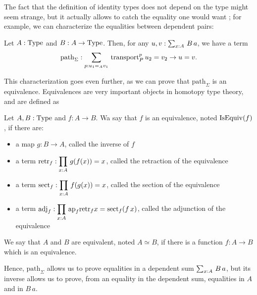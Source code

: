 The fact that the 
definition of identity types does not depend on the type might seem strange, but it
actually allows to catch the equality one would want ; for example, we
can characterize the equalities between dependent pairs:

\begin{lem}
  Let $A:\operatorname{Type}$ and $B:A\to\operatorname{Type}$. Then, for any $u,v:\sum_{x:A}\, B\,
    a$, we have a term
\[ \mathrm{path}_\Sigma : \sum_{p:u_1 =_A v_1}\, \operatorname{transport}_P^p u_2 = v_2 \to u = v.\]
\end{lem}

This characterization goes even further, as we can prove that
$\mathrm{path}_\Sigma$ is an equivalence. Equivalences are very
important objects in homotopy type theory, and are defined as
\begin{defi}[Equivalence]
  Let $A,B:\operatorname{Type}$ and $f:A\to B$. Wa say that $f$ is an equivalence,
  noted $\operatorname{IsEquiv}(f)$, if there are:
  \begin{itemize}
  \item a map $g:B\to A$, called the inverse of $f$
  \item a term $\displaystyle{\mathrm{retr}_f: \prod_{x:A}\, g(f(x)) = x}$,
    called the retraction of the equivalence
  \item a term $\displaystyle{\mathrm{sect}_f: \prod_{x:A}\, f(g(x)) = x}$,
    called the section of the equivalence
  \item a term $\displaystyle{\mathrm{adj}_f: \prod_{x:A}\, \mathrm{ap}_{f} {\mathrm{retr}_f x} =
        \mathrm{sect}_f(f\, x)}$, called the adjunction of the equivalence
  \end{itemize}
  We say that $A$ and $B$ are equivalent, noted $A\simeq
  B$, if there is a
  function $f:A\to B$ which is an equivalence.
\end{defi}

Hence, $\mathrm{path}_\Sigma$ allows us to prove equalities in a
dependent sum $\sum_{x:A}\, B\, a$, but its inverse allows us to prove,
from an equality in the dependent sum, equalities in $A$ and in $B\, a$.

